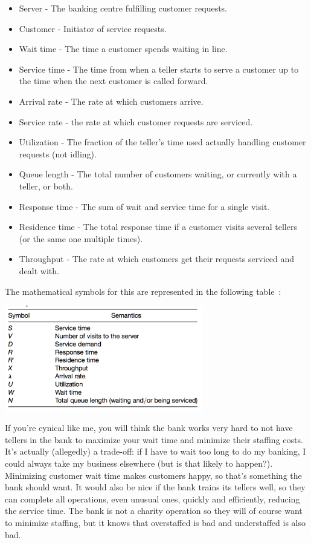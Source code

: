 \documentclass[a4paper]{report}
\begin{document}
\begin{itemize}
	\item Server - The banking centre fulfilling customer requests.
	\item Customer - Initiator of service requests.
	\item Wait time - The time a customer spends waiting in line.
	\item Service time - The time from when a teller starts to serve a customer up to the time when the next customer is called forward.
	\item Arrival rate - The rate at which customers arrive.
	\item Service rate - the rate at which customer requests are serviced.
	\item Utilization - The fraction of the teller's time used actually handling customer requests (not idling).
	\item Queue length - The total number of customers waiting, or currently with a teller, or both.
	\item Response time - The sum of wait and service time for a single visit.
	\item Residence time - The total response time if a customer visits several tellers (or the same one multiple times).
	\item Throughput - The rate at which customers get their requests serviced and dealt with.
\end{itemize}

The mathematical symbols for this are represented in the following table~\cite{swps}:


\begin{center}
	\includegraphics[width=0.65\textwidth]{images/math-symbols.png}
\end{center}

If you're cynical like me, you will think the bank works very hard to not have tellers in the bank to maximize your wait time and minimize their staffing costs. It's actually (allegedly) a trade-off: if I have to wait too long to do my banking, I could always take my business elsewhere (but is that likely to happen?). Minimizing customer wait time makes customers happy, so that's something the bank should want. It would also be nice if the bank trains its tellers well, so they can complete all operations, even unusual ones, quickly and efficiently, reducing the service time. The bank is not a charity operation so they will of course want to minimize staffing, but it knows that overstaffed is bad and understaffed is also bad. 
\end{document}
